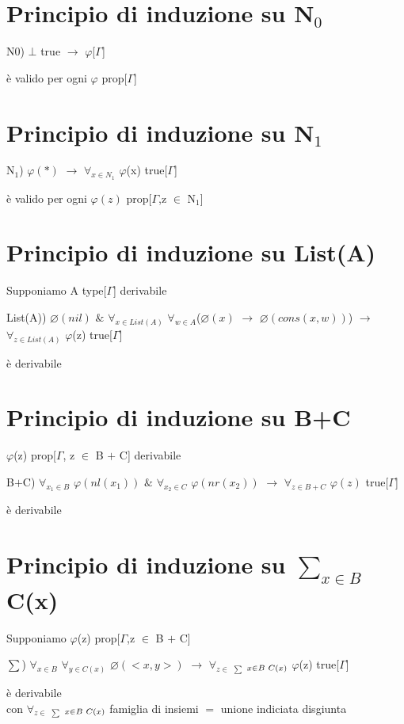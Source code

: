 \section{Principio di induzione su N$_0$}
\label{sec:principio-di-induzione-N0}
\begin{center}N$0$) $\bot$ true $\rightarrow$ $\varphi$[$\Gamma$]\end{center} \`e valido per ogni $\varphi$ prop[$\Gamma$]
\section{Principio di induzione su N$_1$}
\label{sec:principio-di-induzione-N1}
\begin{center}N$_1$) $\varphi(\ast)$ $\rightarrow$ $\forall_{x \in N_1}$ $\varphi$(x) true[$\Gamma$] \end{center}\`e valido per ogni $\varphi(z)$ prop[$\Gamma$,z $\in$ N$_1$]

\section{Principio di induzione su List(A)}
\label{sec:principio-di-induzione-List(A)}
Supponiamo A type[$\Gamma$] derivabile \\
\begin{center}List(A)) $\varnothing(nil)$ $\&$ $\forall_{x \in List(A)}$ $\forall_{w \in A}$($\varnothing(x)$ $\rightarrow$ $\varnothing(cons(x,w))$) $\rightarrow$ $\forall_{z \in List(A)}$ $\varphi$(z) true[$\Gamma$]\end{center} \`e derivabile\\

\section{Principio di induzione su B+C}
\label{sec:principio-di-induzione-B+C}
$\varphi$(z) prop[$\Gamma$, z $\in$ B $+$ C] derivabile
\noindent
\begin{center}B$+$C) $\forall_{x_1 \in B}$  $\varphi(nl(x_1))$ $\&$ $\forall_{x_2 \in C}$  $\varphi(nr(x_2))$ $\rightarrow$ $\forall_{z\in B+C}$  $\varphi(z)$ true[$\Gamma$]\end{center} \`e derivabile
\section{Principio di induzione su $\sum\limits_{x \in B}$ C(x)}
\label{sec:principio-di-induzione-sum}
Supponiamo $\varphi$(z) prop[$\Gamma$,z $\in$ B $+$ C]
\begin{center}{\scriptsize $\sum$}) $\forall_{x \in B}$ $\forall_{y \in C(x)}$ $\varnothing(<x,y>)$ $\rightarrow$ $\forall_{z \in}$ {\scriptsize$_{\sum}$} $_{x \in B \hspace{0.1cm}C(x)}$ $\varphi$(z) true[$\Gamma$]\end{center} \`e derivabile\\
con $\forall_{z \in}$ {\scriptsize$_{\sum}$} $_{x \in B \hspace{0.1cm}C(x)}$ famiglia di insiemi $=$ unione indiciata disgiunta\\

